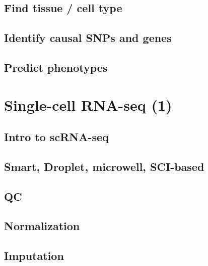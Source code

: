 \documentclass[
]{book}
\begin{document}
\hypertarget{find-tissue-cell-type}{%
\section{Find tissue / cell type}\label{find-tissue-cell-type}}

\hypertarget{identify-causal-snps-and-genes}{%
\section{Identify causal SNPs and genes}\label{identify-causal-snps-and-genes}}

\hypertarget{predict-phenotypes}{%
\section{Predict phenotypes}\label{predict-phenotypes}}

\hypertarget{scrna1}{%
\chapter{Single-cell RNA-seq (1)}\label{scrna1}}

\hypertarget{intro-to-scrna-seq}{%
\section{Intro to scRNA-seq}\label{intro-to-scrna-seq}}

\hypertarget{smart-droplet-microwell-sci-based}{%
\section{Smart, Droplet, microwell, SCI-based}\label{smart-droplet-microwell-sci-based}}

\hypertarget{qc}{%
\section{QC}\label{qc}}

\hypertarget{normalization}{%
\section{Normalization}\label{normalization}}

\hypertarget{imputation}{%
\section{Imputation}\label{imputation}}
\end{document}
